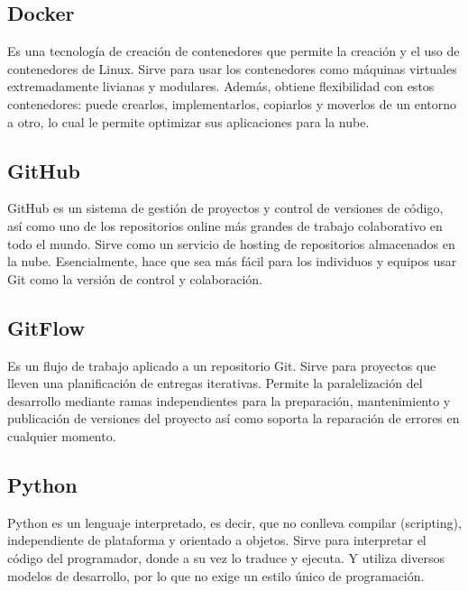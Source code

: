 \documentclass[12pt,letterpaper]{article}
\begin{document}
\subsection*{Docker}
Es una tecnología de creación de contenedores que permite la creación y el uso
de contenedores de Linux. Sirve para usar los contenedores como máquinas
virtuales extremadamente livianas y modulares. Además, obtiene flexibilidad con
estos contenedores: puede crearlos, implementarlos, copiarlos y moverlos de un
entorno a otro, lo cual le permite optimizar sus aplicaciones para la nube.
\citep{redhat_docker}

\subsection*{GitHub}
GitHub es un sistema de gestión de proyectos y control de versiones de código,
así como uno de los repositorios online más grandes de trabajo colaborativo en
todo el mundo.
\citep{hostinger_tutoriales_2019}
Sirve como un servicio de hosting de repositorios almacenados en la nube.
Esencialmente, hace que sea más fácil para los individuos y equipos usar Git
como la versión de control y colaboración.
\citep{kinsta_2020}

\subsection*{GitFlow}
Es un flujo de trabajo aplicado a un repositorio Git. Sirve para proyectos que
lleven una planificación de entregas iterativas. Permite la paralelización del
desarrollo mediante ramas independientes para la preparación, mantenimiento y
publicación de versiones del proyecto así como soporta la reparación de errores
en cualquier momento.
\citep{claventy_2020}

\subsection*{Python}
Python es un lenguaje interpretado, es decir, que no conlleva compilar
(scripting), independiente de plataforma y orientado a objetos. 
\citep{desarrollo_web_2003}
Sirve para interpretar el código del programador, donde a su vez lo traduce y
ejecuta. Y utiliza diversos modelos de desarrollo, por lo que no exige un estilo
único de programación.
\citep{angeles_2020}
\end{document}
